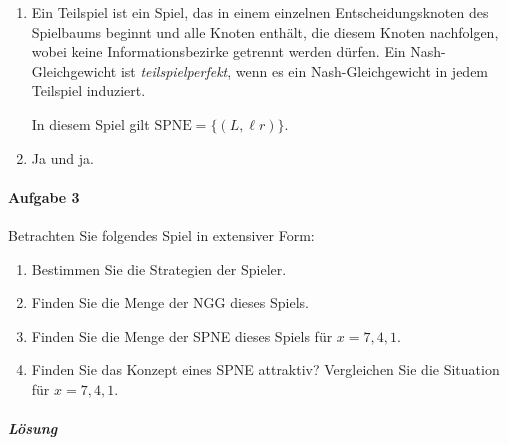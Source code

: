 \begin{enumerate}
  \item Ein Teilspiel ist ein Spiel, das in einem einzelnen Entscheidungsknoten des
    Spielbaums beginnt und alle Knoten enthält, die diesem Knoten nachfolgen, wobei keine
    Informationsbezirke getrennt werden dürfen.
    Ein Nash-Gleichgewicht ist \emph{teilspielperfekt}, wenn es ein Nash-Gleichgewicht in
    jedem Teilspiel induziert.

    In diesem Spiel gilt $\text{SPNE} = \{(L, \ell r)\}$.

  \item Ja und ja.
\end{enumerate}

\paragraph{Aufgabe 3}%
\label{par:serie_6_aufgabe_3}

Betrachten Sie folgendes Spiel in extensiver Form:
\begin{center}
\end{center}

\begin{enumerate}
  \item Bestimmen Sie die Strategien der Spieler.
  \item Finden Sie die Menge der NGG dieses Spiels.
  \item Finden Sie die Menge der SPNE dieses Spiels für $x = 7,4,1$.
  \item Finden Sie das Konzept eines SPNE attraktiv?
    Vergleichen Sie die Situation für $x=7,4,1$.
\end{enumerate}

\subparagraph{Lösung}%

